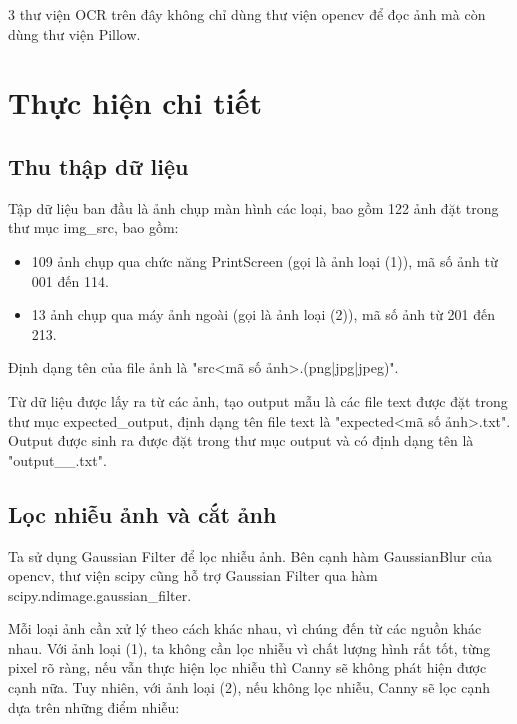 \documentclass[12pt,a4paper]{article}
\begin{document}
3 thư viện OCR trên đây không chỉ dùng thư viện opencv để đọc ảnh mà còn dùng thư viện Pillow.

\section{Thực hiện chi tiết}

\subsection{Thu thập dữ liệu}

\indent Tập dữ liệu ban đầu là ảnh chụp màn hình các loại, bao gồm 122 ảnh đặt trong thư mục img\_src, bao gồm:

\begin{itemize}
	\item 109 ảnh chụp qua chức năng PrintScreen (gọi là ảnh loại (1)), mã số ảnh từ 001 đến 114.
	\item 13 ảnh chụp qua máy ảnh ngoài (gọi là ảnh loại (2)), mã số ảnh từ 201 đến 213.
\end{itemize}

Định dạng tên của file ảnh là "src<mã số ảnh>.(png|jpg|jpeg)".

Từ dữ liệu được lấy ra từ các ảnh, tạo output mẫu là các file text được đặt trong thư mục expected\_output, định dạng tên file text là "expected<mã số ảnh>.txt". Output được sinh ra được đặt trong thư mục output và có định dạng tên là "output\_<tên thư viện>\_<mã số ảnh>.txt".

\subsection{Lọc nhiễu ảnh và cắt ảnh}

\indent Ta sử dụng Gaussian Filter để lọc nhiễu ảnh. Bên cạnh hàm GaussianBlur của opencv, thư viện scipy cũng hỗ trợ Gaussian Filter qua hàm scipy.ndimage.gaussian\_filter.


Mỗi loại ảnh cần xử lý theo cách khác nhau, vì chúng đến từ các nguồn khác nhau. Với ảnh loại (1), ta không cần lọc nhiễu vì chất lượng hình rất tốt, từng pixel rõ ràng, nếu vẫn thực hiện lọc nhiễu thì Canny sẽ không phát hiện được cạnh nữa. Tuy nhiên, với ảnh loại (2), nếu không lọc nhiễu, Canny sẽ lọc cạnh dựa trên những điểm nhiễu:
\end{document}
